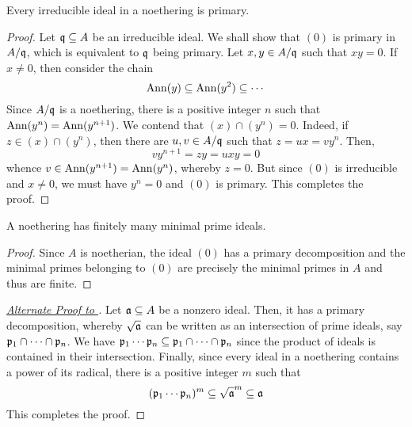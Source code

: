 \begin{lemma}
    Every irreducible ideal in a noethering is primary.
\end{lemma}
\begin{proof}
    Let $\mathfrak q\subseteq A$ be an irreducible ideal. We shall show that $(0)$ is primary in $A/\mathfrak q$, which is equivalent to $\mathfrak q$ being primary. Let $x,y\in A/\mathfrak q$ such that $xy = 0$. If $x\ne 0$, then consider the chain 
    \begin{equation*}
        \operatorname{Ann}(y)\subseteq\operatorname{Ann}(y^2)\subseteq\cdots
    \end{equation*}
    Since $A/\mathfrak q$ is a noethering, there is a positive integer $n$ such that $\operatorname{Ann}(y^n) = \operatorname{Ann}(y^{n + 1})$. We contend that $(x)\cap(y^n) = 0$. Indeed, if $z\in(x)\cap(y^n)$, then there are $u,v\in A/\mathfrak q$ such that $z = ux = vy^n$. Then,
    \begin{equation*}
        vy^{n + 1} = zy = uxy = 0
    \end{equation*}
    whence $v\in\operatorname{Ann}(y^{n + 1}) = \operatorname{Ann}(y^n)$, whereby $z = 0$. But since $(0)$ is irreducible and $x\ne 0$, we must have $y^n = 0$ and $(0)$ is primary. This completes the proof.
\end{proof}

\begin{corollary}
    A noethering has finitely many minimal prime ideals.
\end{corollary}
\begin{proof}
    Since $A$ is noetherian, the ideal $(0)$ has a primary decomposition and the minimal primes belonging to $(0)$ are precisely the minimal primes in $A$ and thus are finite.
\end{proof}

\begin{proof}[\underline{Alternate Proof to }]
    Let $\mathfrak a\subseteq A$ be a nonzero ideal. Then, it has a primary decomposition, whereby $\sqrt{\mathfrak a}$ can be written as an intersection of prime ideals, say $\mathfrak p_1\cap\cdots\cap\mathfrak p_n$. We have $\mathfrak p_1\cdots\mathfrak p_n\subseteq\mathfrak p_1\cap\cdots\cap\mathfrak p_n$ since the product of ideals is contained in their intersection. Finally, since every ideal in a noethering contains a power of its radical, there is a positive integer $m$ such that 
    \begin{equation*}
        (\mathfrak p_1\cdots\mathfrak p_n)^m\subseteq\sqrt{\mathfrak a}^m\subseteq\mathfrak a
    \end{equation*}
    This completes the proof.
\end{proof}

